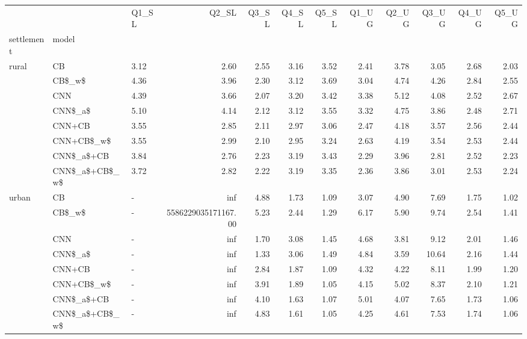 \begin{tabular}{lllrrrrrrrrr}
\toprule
      &                & Q1\_SL &               Q2\_SL &  Q3\_SL &  Q4\_SL &  Q5\_SL &  Q1\_UG &  Q2\_UG &  Q3\_UG &  Q4\_UG &  Q5\_UG \\
settlement & model &       &                     &        &        &        &        &        &        &        &        \\
\midrule
rural & CB &  3.12 &                2.60 &   2.55 &   3.16 &   3.52 &   2.41 &   3.78 &   3.05 &   2.68 &   2.03 \\
      & CB\$\_w\$ &  4.36 &                3.96 &   2.30 &   3.12 &   3.69 &   3.04 &   4.74 &   4.26 &   2.84 &   2.55 \\
      & CNN &  4.39 &                3.66 &   2.07 &   3.20 &   3.42 &   3.38 &   5.12 &   4.08 &   2.52 &   2.67 \\
      & CNN\$\_a\$ &  5.10 &                4.14 &   2.12 &   3.12 &   3.55 &   3.32 &   4.75 &   3.86 &   2.48 &   2.71 \\
      & CNN+CB &  3.55 &                2.85 &   2.11 &   2.97 &   3.06 &   2.47 &   4.18 &   3.57 &   2.56 &   2.44 \\
      & CNN+CB\$\_w\$ &  3.55 &                2.99 &   2.10 &   2.95 &   3.24 &   2.63 &   4.19 &   3.54 &   2.53 &   2.44 \\
      & CNN\$\_a\$+CB &  3.84 &                2.76 &   2.23 &   3.19 &   3.43 &   2.29 &   3.96 &   2.81 &   2.52 &   2.23 \\
      & CNN\$\_a\$+CB\$\_w\$ &  3.72 &                2.82 &   2.22 &   3.19 &   3.35 &   2.36 &   3.86 &   3.01 &   2.53 &   2.24 \\
urban & CB &     - &                 inf &   4.88 &   1.73 &   1.09 &   3.07 &   4.90 &   7.69 &   1.75 &   1.02 \\
      & CB\$\_w\$ &     - & 5586229035171167.00 &   5.23 &   2.44 &   1.29 &   6.17 &   5.90 &   9.74 &   2.54 &   1.41 \\
      & CNN &     - &                 inf &   1.70 &   3.08 &   1.45 &   4.68 &   3.81 &   9.12 &   2.01 &   1.46 \\
      & CNN\$\_a\$ &     - &                 inf &   1.33 &   3.06 &   1.49 &   4.84 &   3.59 &  10.64 &   2.16 &   1.44 \\
      & CNN+CB &     - &                 inf &   2.84 &   1.87 &   1.09 &   4.32 &   4.22 &   8.11 &   1.99 &   1.20 \\
      & CNN+CB\$\_w\$ &     - &                 inf &   3.91 &   1.89 &   1.05 &   4.15 &   5.02 &   8.37 &   2.10 &   1.21 \\
      & CNN\$\_a\$+CB &     - &                 inf &   4.10 &   1.63 &   1.07 &   5.01 &   4.07 &   7.65 &   1.73 &   1.06 \\
      & CNN\$\_a\$+CB\$\_w\$ &     - &                 inf &   4.83 &   1.61 &   1.05 &   4.25 &   4.61 &   7.53 &   1.74 &   1.06 \\
\bottomrule
\end{tabular}
